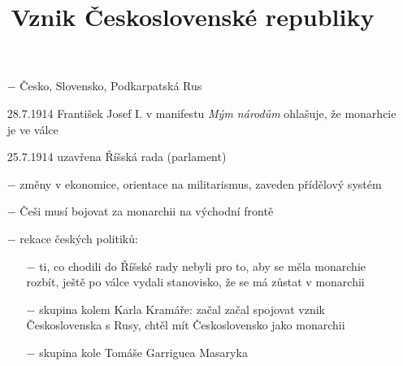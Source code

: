\documentclass{article}
\title{\vspace{-2cm}Vznik Československé republiky\vspace{-1.7cm}}
\date{}
\author{}
\begin{document}
\maketitle

\begin{itemize}
    \vspace{-0.5em}
    \setlength\itemsep{0.15em}
    \item[$-$] Česko, Slovensko, Podkarpatská Rus
    \item[28.7.1914] František Josef I. v manifestu \textit{Mým národům} ohlašuje, že monarhcie je ve válce
    \item[25.7.1914]uzavřena Říšská rada (parlament)
    \item[$-$] změny v ekonomice, orientace na militarismus, zaveden přídělový systém
    \item[$-$] Češi musí bojovat za monarchii na východní frontě
    \item[$-$] rekace českých politiků:
    \begin{itemize}
        \vspace{-0.5em}
        \setlength\itemsep{0.15em}
        \item[$-$] ti, co chodili do Říšské rady nebyli pro to, aby se měla monarchie rozbít, ještě po válce vydali stanovisko, že se má zůstat v monarchii
        \item[$-$] skupina kolem Karla Kramáře: začal začal spojovat vznik Československa s Rusy, chtěl mít Československo jako monarchii
        \item[$-$] skupina kole Tomáše Garriguea Masaryka
    \end{itemize}
\end{itemize}
\end{document}
